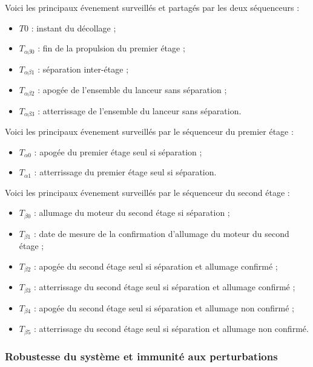 Voici les principaux évenement surveillés et partagés par les deux séquenceurs :
\begin{itemize}
    \item $T0$ : instant du décollage ;
    \item $T_{\alpha\beta0}$ : fin de la propulsion du premier étage ;
    \item $T_{\alpha\beta1}$ : séparation inter-étage ;
    \item $T_{\alpha\beta2}$ : apogée de l'ensemble du lanceur sans séparation ;
    \item $T_{\alpha\beta3}$ : atterrissage de l'ensemble du lanceur sans séparation.\\
\end{itemize}

\newpage

Voici les principaux évenement surveillés par le séquenceur du premier étage :
\begin{itemize}
    \item $T_{\alpha0}$ : apogée du premier étage seul si séparation ;
    \item $T_{\alpha1}$ : atterrissage du premier étage seul si séparation.\\
\end{itemize}

Voici les principaux évenement surveillés par le séquenceur du second étage :
\begin{itemize}
    \item $T_{\beta0}$ : allumage du moteur du second étage si séparation ;
    \item $T_{\beta1}$ : date de mesure de la confirmation d’allumage du moteur du second étage ;
    \item $T_{\beta2}$ : apogée du second étage seul si séparation et allumage confirmé ;
    \item $T_{\beta3}$ : atterrissage du second étage seul si séparation et allumage confirmé ;
    \item $T_{\beta4}$ : apogée du second étage seul si séparation et allumage non confirmé ;
    \item $T_{\beta5}$ : atterrissage du second étage seul si séparation et allumage non confirmé.\\
\end{itemize}

\subsubsection{Robustesse du système et immunité aux perturbations}

